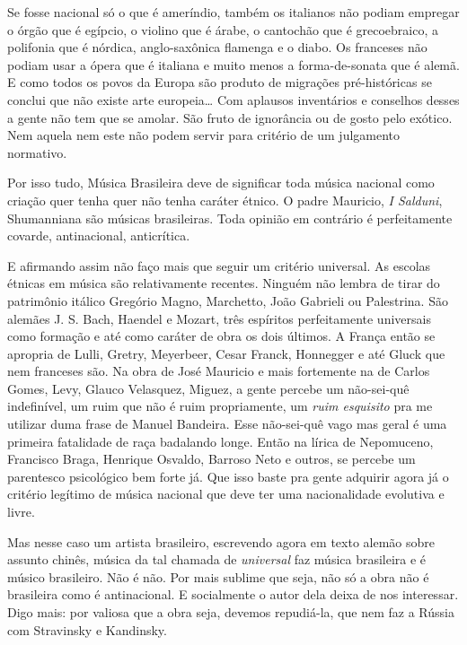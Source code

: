 Se fosse nacional só o que é ameríndio, também os italianos não podiam
empregar o órgão que é egípcio, o violino que é árabe, o cantochão que é
grecoebraico, a polifonia que é nórdica, anglo-saxônica flamenga e o
diabo. Os franceses não podiam usar a ópera que é italiana e muito menos
a forma-de-sonata que é alemã. E como todos os povos da Europa são
produto de migrações pré-históricas se conclui que não existe arte
europeia\ldots{} Com aplausos inventários e conselhos desses a gente não tem
que se amolar. São fruto de ignorância ou de gosto pelo exótico. Nem
aquela nem este não podem servir para critério de um julgamento
normativo.

Por isso tudo, Música Brasileira deve de significar toda música nacional
como criação quer tenha quer não tenha caráter étnico. O padre Mauricio,
\emph{I Salduni}, Shumanniana são músicas brasileiras. Toda opinião em
contrário é perfeitamente covarde, antinacional, anticrítica.

E afirmando assim não faço mais que seguir um critério universal. As
escolas étnicas em música são relativamente recentes. Ninguém não lembra
de tirar do patrimônio itálico Gregório Magno, Marchetto, João Gabrieli
ou Palestrina. São alemães J. S. Bach, Haendel e Mozart, três espíritos
perfeitamente universais como formação e até como caráter de obra os
dois últimos. A França então se apropria de Lulli, Gretry, Meyerbeer,
Cesar Franck, Honnegger e até Gluck que nem franceses são. Na obra de
José Mauricio e mais fortemente na de Carlos Gomes, Levy, Glauco
Velasquez, Miguez, a gente percebe um não-sei-quê indefinível, um ruim
que não é ruim propriamente, um \emph{ruim esquisito} pra me utilizar
duma frase de Manuel Bandeira. Esse não-sei-quê vago mas geral é uma
primeira fatalidade de raça badalando longe. Então na lírica de
Nepomuceno, Francisco Braga, Henrique Osvaldo, Barroso Neto e outros, se
percebe um parentesco psicológico bem forte já. Que isso baste pra gente
adquirir agora já o critério legítimo de música nacional que deve ter
uma nacionalidade evolutiva e livre.

Mas nesse caso um artista brasileiro, escrevendo agora em texto alemão
sobre assunto chinês, música da tal chamada de \emph{universal} faz
música brasileira e é músico brasileiro. Não é não. Por mais sublime que
seja, não só a obra não é brasileira como é antinacional. E socialmente
o autor dela deixa de nos interessar. Digo mais: por valiosa que a obra
seja, devemos repudiá-la, que nem faz a Rússia com Stravinsky e
Kandinsky.

